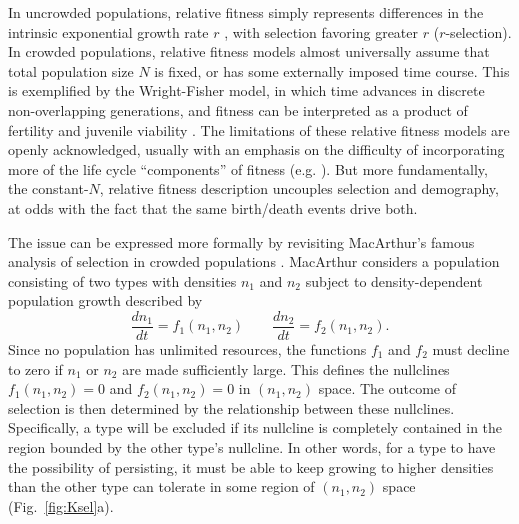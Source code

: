 \documentclass[11pt]{article}
\begin{document}
In uncrowded populations, relative fitness simply represents differences in the intrinsic exponential growth rate $r$ \citep[pp. 26]{crow_1970}, with selection favoring greater $r$ ($r$-selection). In crowded populations, relative fitness models almost universally assume that total population size $N$ is fixed, or has some externally imposed time course. This is exemplified by the Wright-Fisher model, in which time advances in discrete non-overlapping generations, and fitness can be interpreted as a product of fertility and juvenile viability \citep[pp. 185]{crow_1970}. The limitations of these relative fitness models are openly acknowledged, usually with an emphasis on the difficulty of incorporating more of the life cycle ``components'' of fitness (e.g. \cite[pp. 276]{ewens_2004}). But more fundamentally, the constant-$N$, relative fitness description uncouples selection and demography, at odds with the fact that the same birth/death events drive both. 

The issue can be expressed more formally by revisiting MacArthur's famous analysis of selection in crowded populations \citep{macarthur_1967}. MacArthur considers a population consisting of two types with densities $n_1$ and $n_2$ subject to density-dependent population growth described by
\begin{equation}
\frac{d n_1}{d t}=f_1(n_1,n_2)\qquad\frac{d n_2}{d t}=f_2(n_1,n_2). \label{eq:macgeneral}
\end{equation}
Since no population has unlimited resources, the functions $f_1$ and $f_2$ must decline to zero if $n_1$ or $n_2$ are made sufficiently large. This defines the nullclines $f_1(n_1,n_2)=0$ and $f_2(n_1,n_2)=0$ in $(n_1,n_2)$ space. The outcome of selection is then determined by the relationship between these nullclines. Specifically, a type will be excluded if its nullcline is completely contained in the region bounded by the other type's nullcline. In other words, for a type to have the possibility of persisting, it must be able to keep growing to higher densities than the other type can tolerate in some region of $(n_1,n_2)$ space (Fig.~\ref{fig:Ksel}a). 
\end{document}

